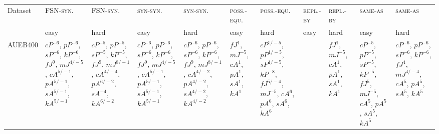 \documentclass[letterpaper]{article} %
\newcommand{\dataset}[1]{\textsc{#1}}
\begin{document}
\begin{sidewaystable*}
    \centering
    \small
    \begin{tabular}{l l l l l l l l l l l }
    \toprule
         Dataset & \dataset{FSN-syn.} & \dataset{FSN-syn.} & \dataset{syn-syn.} & \dataset{syn-syn.}& \dataset{poss.-equ.} & \dataset{poss.-equ.} & \dataset{repl.-by} & \dataset{repl.-by} & \dataset{same-as} & \dataset{same-as} \\
& easy & hard & easy & hard& easy & hard & easy & hard & easy & hard \\ 
         \midrule
\multirow{10}{1.7cm}{AUEB400} & \multirow{10}{1.7cm}{$cP^{-6}$, $pP^{-6}$, $sP^{-6}$, $kP^{-6}$, $fJ^{9}$, $mJ^{4/-5}$, $cA^{5/-1}$, $pA^{5/-1}$, $sA^{5/-1}$, $kA^{5/-1}$} & \multirow{10}{1.7cm}{$cP^{-5}$, $pP^{-5}$, $sP^{-5}$, $kP^{-5}$, $fJ^{9}$, $mJ^{8/-1}$, $cA^{4/-4}$, $pA^{6/-2}$, $sA^{-4}$, $kA^{6/-2}$} & \multirow{10}{1.7cm}{$cP^{-6}$, $pP^{-6}$, $sP^{-6}$, $kP^{-6}$, $fJ^{9}$, $mJ^{4/-5}$, $cA^{5/-1}$, $pA^{5/-1}$, $sA^{5/-1}$, $kA^{5/-1}$} & \multirow{10}{1.7cm}{$cP^{-6}$, $pP^{-6}$, $sP^{-6}$, $kP^{-6}$, $fJ^{9}$, $mJ^{8/-1}$, $cA^{4/-2}$, $pA^{4/-2}$, $sA^{4/-2}$, $kA^{4/-2}$} & \multirow{10}{1.7cm}{$fJ^{1}$, $mJ^{-5}$, $cA^{1}$, $pA^{1}$, $sA^{1}$, $kA^{1}$} & \multirow{10}{1.7cm}{$cP^{1/-5}$, $pP^{1/-5}$, $sP^{1/-5}$, $kP^{-8}$, $fJ^{5/-4}$, $mJ^{-5}$, $cA^{6}$, $pA^{6}$, $sA^{6}$, $kA^{6}$} & \multirow{10}{1.7cm}{} & \multirow{10}{1.7cm}{$fJ^{1}$, $mJ^{-5}$, $cA^{1}$, $pA^{1}$, $sA^{1}$, $kA^{1}$} & \multirow{10}{1.7cm}{$cP^{-5}$, $pP^{-5}$, $sP^{-5}$, $kP^{-5}$, $fJ^{5}$, $mJ^{-5}$, $cA^{5}$, $pA^{5}$, $sA^{5}$, $kA^{5}$} & \multirow{10}{1.7cm}{$cP^{-6}$, $pP^{-6}$, $sP^{-6}$, $kP^{-6}$, $fJ^{4}$, $mJ^{4/-4}$, $cA^{5}$, $pA^{5}$, $sA^{5}$, $kA^{5}$} \\ \\ \\ \\ \\ \\ \\ \\ \\ \\
\midrule

\end{tabular}
\end{sidewaystable*}
\end{document}
